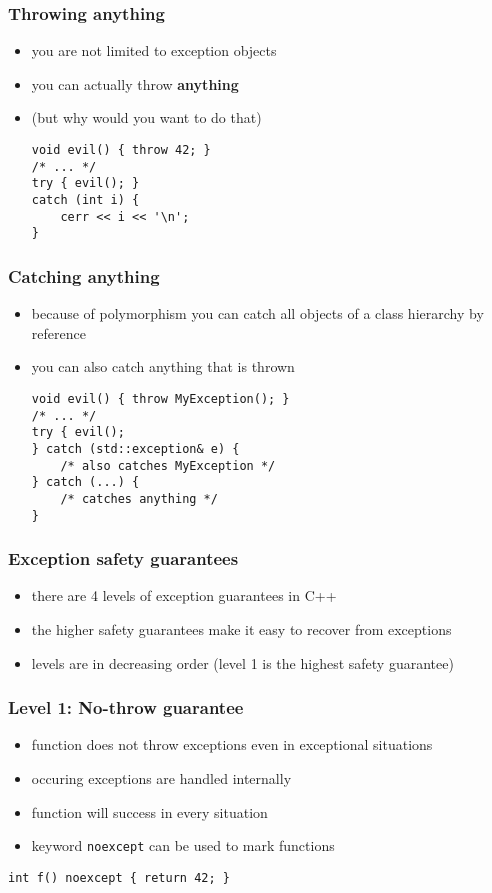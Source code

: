 \begin{frame}[fragile]
    \frametitle{Throwing anything}
    \begin{itemize}
    \item you are not limited to exception objects
    \item you can actually throw \textbf{anything}
    \item (but why would you want to do that)
    \begin{lstlisting}[numbers=none]
void evil() { throw 42; }
/* ... */
try { evil(); } 
catch (int i) {
    cerr << i << '\n';
}
    \end{lstlisting}
    \end{itemize}
\end{frame}

\begin{frame}[fragile]
    \frametitle{Catching anything}
    \begin{itemize}
    \item because of polymorphism you can catch all objects of a class hierarchy by reference
    \item you can also catch anything that is thrown
    \begin{lstlisting}[numbers=none]
void evil() { throw MyException(); }
/* ... */
try { evil(); 
} catch (std::exception& e) {
    /* also catches MyException */
} catch (...) {
    /* catches anything */
}
    \end{lstlisting}
    \end{itemize}
\end{frame}

\begin{frame}[fragile]
    \frametitle{Exception safety guarantees}
    \begin{itemize}
        \item there are 4 levels of exception guarantees in C++
        \item the higher safety guarantees make it easy to recover from exceptions
        \item levels are in decreasing order (level 1 is the highest safety guarantee)
    \end{itemize}
\end{frame}

\begin{frame}[fragile]
    \frametitle{Level 1: No-throw guarantee}
    \begin{itemize}
        \item function does not throw exceptions even in exceptional situations
        \item occuring exceptions are handled internally
        \item function will success in every situation
        \item keyword \lstinline{noexcept} can be used to mark functions
    \end{itemize}
    \begin{lstlisting}[numbers=none]
int f() noexcept { return 42; }
    \end{lstlisting}
\end{frame}



